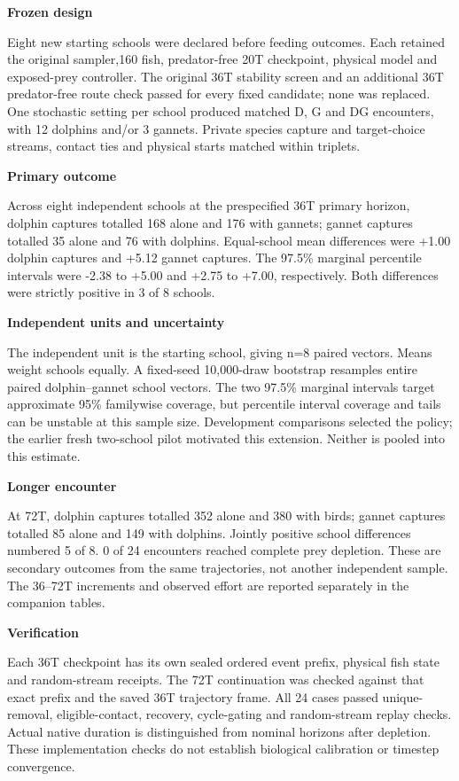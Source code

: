 \documentclass[10pt,a4paper]{article}
\begin{document}
\begin{minipage}[t]{238.10999999999999pt}\vspace{0pt}
\textbf{Frozen design}\par Eight new starting schools were declared before feeding outcomes. Each retained the original sampler,160 fish, predator-free 20T checkpoint, physical model and exposed-prey controller. The original 36T stability screen and an additional 36T predator-free route check passed for every fixed candidate; none was replaced. One stochastic setting per school produced matched D, G and DG encounters, with 12 dolphins and/or 3 gannets. Private species capture and target-choice streams, contact ties and physical starts matched within triplets.\par\smallskip
\textbf{Primary outcome}\par Across eight independent schools at the prespecified 36T primary horizon, dolphin captures totalled 168 alone and 176 with gannets; gannet captures totalled 35 alone and 76 with dolphins. Equal-school mean differences were +1.00 dolphin captures and +5.12 gannet captures. The 97.5\% marginal percentile intervals were -2.38 to +5.00 and +2.75 to +7.00, respectively. Both differences were strictly positive in 3 of 8 schools.\par\smallskip
\end{minipage}
\hfill
\begin{minipage}[t]{238.10999999999999pt}\vspace{0pt}
\textbf{Independent units and uncertainty}\par The independent unit is the starting school, giving n=8 paired vectors. Means weight schools equally. A fixed-seed 10,000-draw bootstrap resamples entire paired dolphin--gannet school vectors. The two 97.5\% marginal intervals target approximate 95\% familywise coverage, but percentile interval coverage and tails can be unstable at this sample size. Development comparisons selected the policy; the earlier fresh two-school pilot motivated this extension. Neither is pooled into this estimate.\par\smallskip
\textbf{Longer encounter}\par At 72T, dolphin captures totalled 352 alone and 380 with birds; gannet captures totalled 85 alone and 149 with dolphins. Jointly positive school differences numbered 5 of 8. 0 of 24 encounters reached complete prey depletion. These are secondary outcomes from the same trajectories, not another independent sample. The 36--72T increments and observed effort are reported separately in the companion tables.\par\smallskip
\textbf{Verification}\par Each 36T checkpoint has its own sealed ordered event prefix, physical fish state and random-stream receipts. The 72T continuation was checked against that exact prefix and the saved 36T trajectory frame. All 24 cases passed unique-removal, eligible-contact, recovery, cycle-gating and random-stream replay checks. Actual native duration is distinguished from nominal horizons after depletion. These implementation checks do not establish biological calibration or timestep convergence.\par\smallskip
\end{minipage}
\end{document}
